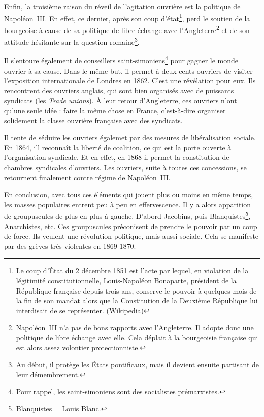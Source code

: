 \documentclass[12pt]{report}
\begin{document}
Enfin, la troisième raison du réveil de l'agitation ouvrière est la politique de Napoléon~III.
En effet, ce dernier, après son coup d’état\footnote{Le coup d'État du 2 décembre 1851 est l'acte par lequel, en violation de la légitimité constitutionnelle, Louis-Napoléon Bonaparte, président de la République française depuis trois ans, conserve le pouvoir à quelques mois de la fin de son mandat alors que la Constitution de la Deuxième République lui interdisait de se représenter. (\href{https://fr.wikipedia.org/wiki/Coup_d\%27\%C3\%89tat_du_2_d\%C3\%A9cembre_1851}{Wikipedia})}, perd le soutien de la bourgeoise à cause de sa politique de libre-échange avec l’Angleterre\footnote{Napoléon~III n'a pas de bons rapports avec l'Angleterre. Il adopte donc une politique de libre échange avec elle. Cela déplait à la bourgeoisie française qui est alors assez volontier protectionniste.} et de son attitude hésitante sur la question romaine\footnote{Au début, il protège les États pontificaux, mais il devient ensuite partisant de leur démembrement.}.

Il s’entoure également de conseillers saint-simoniens\footnote{Pour rappel, les saint-simoniens sont des socialistes prémarxistes.} pour gagner le monde ouvrier à sa cause.
Dans le même but, il permet à deux cents ouvriers de visiter l’exposition internationale de Londres en 1862.
C’est une révélation pour eux.
Ils rencontrent des ouvriers anglais, qui sont bien organisés avec de puissants syndicats (les \emph{Trade unions}).
À leur retour d'Angleterre, ces ouvriers n'ont qu'une seule idée : faire la même chose en France, c'est-à-dire organiser solidement la classe ouvrière française avec des syndicats.

Il tente de séduire les ouvriers égalemet par des mesures de libéralisation sociale.
En 1864, ill reconnaît la liberté de coalition, ce qui est la porte ouverte à l’organisation syndicale.
Et en effet, en 1868 il permet la constitution de chambres syndicales d’ouvriers.
Les ouvriers, suite à toutes ces concessions, se retournent finalement contre régime de Napoléon~III.

En conclusion, avec tous ces éléments qui jouent plus ou moins en même temps, les masses populaires entrent peu à peu en effervescence. 
Il y a alors apparition de groupuscules de plus en plus à gauche.
D'abord Jacobins, puis Blanquistes\footnote{Blanquistes = Louis Blanc.}, Anarchistes, etc. 
Ces groupuscules préconisent de prendre le pouvoir par un coup de force. 
Ils veulent une révolution politique, mais aussi sociale. 
Cela se manifeste par des grèves très violentes en 1869-1870.
\end{document}
